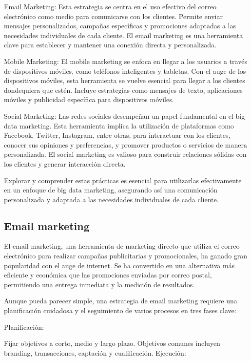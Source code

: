 \documentclass[
    a4paper, %
    10pt, %
    unnumberedsections, %
    twoside, %
]{LTJournalArticle}
\begin{document}
Email Marketing: Esta estrategia se centra en el uso efectivo del correo electrónico como medio para comunicarse con los clientes. Permite enviar mensajes personalizados, campañas específicas y promociones adaptadas a las necesidades individuales de cada cliente. El email marketing es una herramienta clave para establecer y mantener una conexión directa y personalizada.

Mobile Marketing: El mobile marketing se enfoca en llegar a los usuarios a través de dispositivos móviles, como teléfonos inteligentes y tabletas. Con el auge de los dispositivos móviles, esta herramienta se vuelve esencial para llegar a los clientes dondequiera que estén. Incluye estrategias como mensajes de texto, aplicaciones móviles y publicidad específica para dispositivos móviles.

Social Marketing: Las redes sociales desempeñan un papel fundamental en el big data marketing. Esta herramienta implica la utilización de plataformas como Facebook, Twitter, Instagram, entre otras, para interactuar con los clientes, conocer sus opiniones y preferencias, y promover productos o servicios de manera personalizada. El social marketing es valioso para construir relaciones sólidas con los clientes y generar interacción directa.

Explorar y comprender estas prácticas es esencial para utilizarlas efectivamente en un enfoque de big data marketing, asegurando así una comunicación personalizada y adaptada a las necesidades individuales de cada cliente.



\subsection{Email marketing}

El email marketing, una herramienta de marketing directo que utiliza el correo electrónico para realizar campañas publicitarias y promocionales, ha ganado gran popularidad con el auge de internet. Se ha convertido en una alternativa más eficiente y económica que las promociones enviadas por correo postal, permitiendo una entrega inmediata y la medición de resultados.

Aunque pueda parecer simple, una estrategia de email marketing requiere una planificación cuidadosa y el seguimiento de varios procesos en tres fases clave:

Planificación:

Fijar objetivos a corto, medio y largo plazo.
Objetivos comunes incluyen branding, transacciones, captación y cualificación.
Ejecución:
\end{document}
